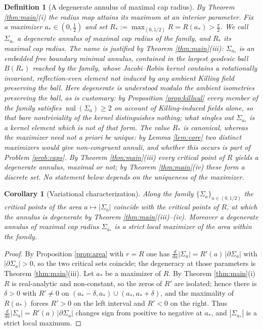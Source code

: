 \documentclass[10pt,a4paper]{amsart}
\newtheorem{corollary}[theorem]{Corollary}
\newtheorem{definition}[theorem]{Definition}
\newcommand{\nul}{\operatorname{nul}}
\begin{document}
\begin{definition}[A degenerate annulus of maximal cap radius]\label{def:degannulus}
By Theorem \ref{thm:main}(i) the radius map attains its maximum at an interior parameter. Fix a maximizer $a_*\in(0,\tfrac12)$ and set $R_*:=\max_{(0,1/2)}R=R(a_*)>\tfrac\pi2$. We call $\Sigma_{a_*}$ \emph{a degenerate annulus of maximal cap radius} of the family, and $R_*$ its \emph{maximal cap radius}. The name is justified by Theorem \ref{thm:main}(iii): $\Sigma_{a_*}$ is an embedded free boundary minimal annulus, contained in the largest geodesic ball $B(R_*)$ reached by the family, whose Jacobi--Robin kernel contains a rotationally invariant, reflection-even element not induced by any ambient Killing field preserving the ball. Here \emph{degenerate} is understood modulo the ambient isometries preserving the ball, as is customary: by Proposition \ref{prop:killnul} every member of the family satisfies $\nul(\Sigma_a)\geq 2$ on account of Killing-induced fields alone, so that bare nontriviality of the kernel distinguishes nothing; what singles out $\Sigma_{a_*}$ is a kernel element which is \emph{not} of that form. The value $R_*$ is canonical, whereas the maximizer need not a priori be unique: by Lemma \ref{lem:core} two distinct maximizers would give non-congruent annuli, and whether this occurs is part of Problem \ref{prob:caps}. By Theorem \ref{thm:main}(iii) \emph{every} critical point of $R$ yields a degenerate annulus, maximal or not; by Theorem \ref{thm:main}(iv) these form a discrete set. No statement below depends on the uniqueness of the maximizer.
\end{definition}

\begin{corollary}[Variational characterization]\label{cor:areamax}
Along the family $\{\Sigma_a\}_{a\in(0,1/2)}$ the critical points of the area $a\mapsto|\Sigma_a|$ coincide with the critical points of $R$, at which the annulus is degenerate by Theorem \ref{thm:main}(iii)--(iv). Moreover a degenerate annulus of maximal cap radius $\Sigma_{a_*}$ is a strict local maximizer of the area within the family.
\end{corollary}

\begin{proof}
By Proposition \ref{prop:area} with $r=R$ one has $\frac{d}{da}|\Sigma_a|=R'(a)\,|\partial\Sigma_a|$ with $|\partial\Sigma_a|>0$, so the two critical sets coincide; the degeneracy at those parameters is Theorem \ref{thm:main}(iii). Let $a_*$ be a maximizer of $R$. By Theorem \ref{thm:main}(i) $R$ is real-analytic and non-constant, so the zeros of $R'$ are isolated; hence there is $\delta>0$ with $R'\neq 0$ on $(a_*-\delta,a_*)\cup(a_*,a_*+\delta)$, and the maximality of $R(a_*)$ forces $R'>0$ on the left interval and $R'<0$ on the right. Thus $\frac{d}{da}|\Sigma_a|=R'(a)\,|\partial\Sigma_a|$ changes sign from positive to negative at $a_*$, and $|\Sigma_{a_*}|$ is a strict local maximum.
\end{proof}
\end{document}
